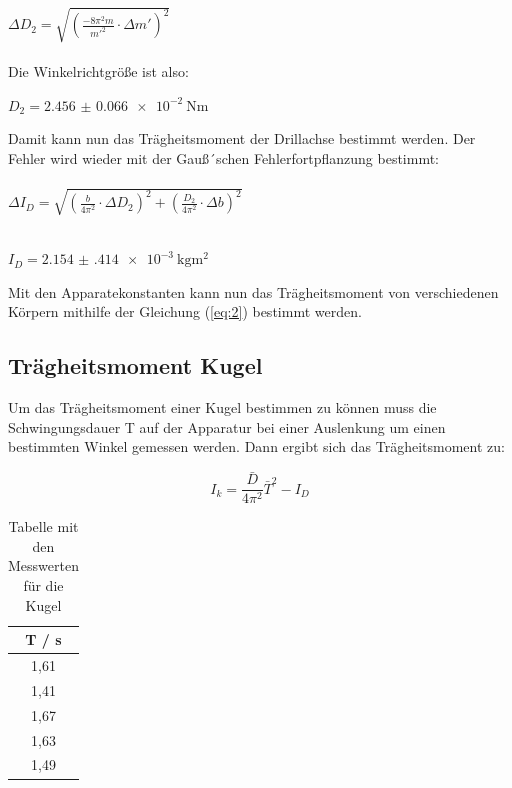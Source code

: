 $\Delta D_2 = \sqrt{\left(\frac{-8\pi^2m}{m'^2} \cdot \Delta m' \right)^2}$\\\\

Die Winkelrichtgröße ist also:

\centerline{$D_2 = \SI{2.456(66)e-2}{\N\meter}$}

Damit kann nun das Trägheitsmoment der Drillachse bestimmt werden. Der Fehler wird
wieder mit der Gauß´schen Fehlerfortpflanzung bestimmt:\\\\

$\Delta I_D = \sqrt{\left(\frac{b}{4\pi^2} \cdot \Delta D_2 \right)^2 +
\left(\frac{D_2}{4\pi^2} \cdot \Delta b \right)^2}$\\\\

\centerline{$I_D = \SI{2.154(414)e-3}{\kilo\gram\meter\squared}$}

Mit den Apparatekonstanten kann nun das Trägheitsmoment von verschiedenen Körpern
mithilfe der Gleichung (\ref{eq:2}) bestimmt werden.


\subsection{Trägheitsmoment Kugel}

Um das Trägheitsmoment einer Kugel bestimmen zu können muss die Schwingungsdauer T
auf der Apparatur bei einer Auslenkung um einen bestimmten Winkel gemessen werden.
Dann ergibt sich das Trägheitsmoment zu:

\begin{equation}
  I_k = \frac{\bar{D}}{4\pi^2}\bar{T}^2 - I_D
  \label{eq:9}
\end{equation}

\begin{table}[H]
  \centering
  \caption{Tabelle mit den Messwerten für die Kugel}
  \begin{tabular}{c}
    \toprule
    T / \si{\second} \\
    \midrule
    1,61 \\
    1,41 \\
    1,67 \\
    1,63 \\
    1,49 \\
    \bottomrule
  \end{tabular}
  \label{fig:tab3}
\end{table}

